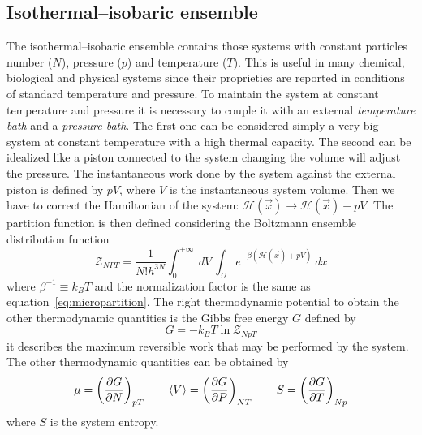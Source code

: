 \subsection{Isothermal--isobaric ensemble}
The isothermal--isobaric ensemble contains those systems with constant particles number ($N$), pressure ($p$) and temperature ($T$). This is useful in many chemical, biological and physical systems since their proprieties are reported in conditions of standard temperature and pressure. To maintain the system at constant temperature and pressure it is necessary to couple it with an external \textit{temperature bath} and a \textit{pressure bath}.
The first one can be considered simply a very big system at constant temperature with a high thermal capacity.
The second can be idealized like a piston connected to the system changing the volume will adjust the pressure.
The instantaneous work done by the system against the external piston is defined by $pV$, where $V$ is the instantaneous system volume. Then we have to correct the Hamiltonian of the system: $\mathcal{H}(\vec x) \rightarrow \mathcal{H}(\vec x) + pV$. The partition function is then defined considering the Boltzmann ensemble distribution function
\begin{equation*}
	\mathcal{Z}_{NPT} = \frac{1}{N!h^{3N}}\int_0^{+\infty}\ dV \ \int_\Omega e^{-\beta(\mathcal{H}(\vec x) + pV)}\ dx
\end{equation*}
where $\beta^{-1} \equiv k_B T$ and the normalization factor is the same as equation~\eqref{eq:micropartition}. The right thermodynamic potential to obtain the other thermodynamic quantities is the Gibbs free energy $G$ defined by
\begin{equation*}
	G = -k_B T\ln \mathcal{Z}_{NpT}
\end{equation*}
it describes the maximum reversible work that may be performed by the system. The other thermodynamic quantities can be obtained by
\begin{equation*}
	\mu = \left ( \frac{\partial G}{\partial N}\right )_{pT} \qquad \langle V \rangle = \left ( \frac{\partial G}{\partial P}\right )_{NT} \qquad S = \left ( \frac{\partial G}{\partial T}\right )_{Np}
\end{equation*}
where $S$ is the system entropy.


